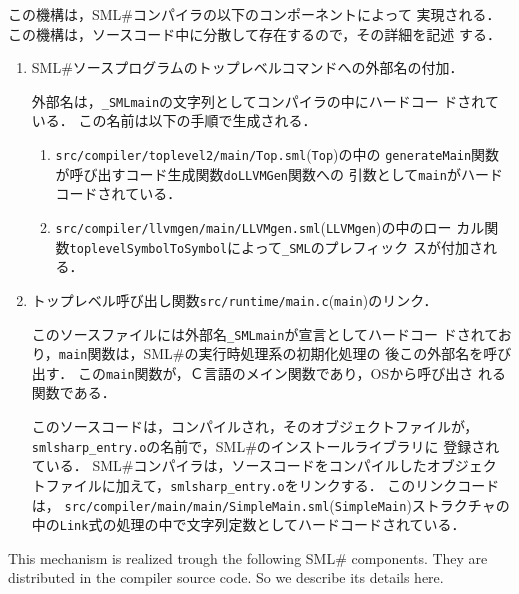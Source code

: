 \documentclass{jbook}
\newcommand{\smlsharp}{SML\#}
\newcommand{\code}[1]{\mbox{\large\tt #1}}
\newcommand{\module}[2]{\code{#1}(\code{#2})}
\begin{document}
\ifjp%
	この機構は，\smlsharp{}コンパイラの以下のコンポーネントによって
実現される．
	この機構は，ソースコード中に分散して存在するので，その詳細を記述
する．
\begin{enumerate}
\item \smlsharp{}ソースプログラムのトップレベルコマンドへの外部名の付加．

	外部名は，\code{\_SMLmain}の文字列としてコンパイラの中にハードコー
ドされている．
	この名前は以下の手順で生成される．
\begin{enumerate}
\item \module{src/compiler/toplevel2/main/Top.sml}{Top}の中の
\code{generateMain}関数が呼び出すコード生成関数\code{doLLVMGen}関数への
引数として\code{main}がハードコードされている．
\item \module{src/compiler/llvmgen/main/LLVMgen.sml}{LLVMgen}の中のロー
カル関数\code{toplevelSymbolToSymbol}によって\code{\_SML}のプレフィック
スが付加される．
\end{enumerate}

\item トップレベル呼び出し関数\module{src/runtime/main.c}{main}のリンク．

	このソースファイルには外部名\code{\_SMLmain}が宣言としてハードコー
ドされており，\code{main}関数は，\smlsharp{}の実行時処理系の初期化処理の
後この外部名を呼び出す．
	この\code{main}関数が，Ｃ言語のメイン関数であり，OSから呼び出さ
れる関数である．

	このソースコードは，コンパイルされ，そのオブジェクトファイルが，
\code{smlsharp\_entry.o}の名前で，\smlsharp{}のインストールライブラリに
登録されている．
	\smlsharp{}コンパイラは，ソースコードをコンパイルしたオブジェク
トファイルに加えて，\code{smlsharp\_entry.o}をリンクする．
	このリンクコードは，
\module{src/compiler/main/main/SimpleMain.sml}{SimpleMain}ストラクチャの
中の\code{Link}式の処理の中で文字列定数としてハードコードされている．
\end{enumerate}
\else%
	This mechanism is realized trough the following \smlsharp{}
components.
	They are distributed in the compiler source code.
	So we describe its details here.
\end{document}
